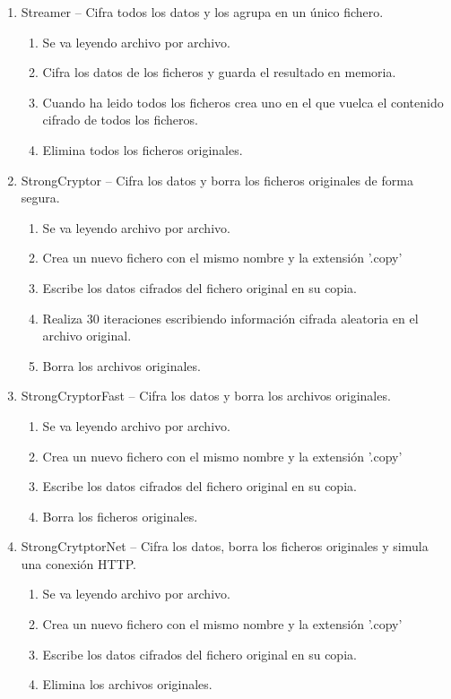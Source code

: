 \documentclass[a4paper,12pt]{article}
\begin{document}
\begin{enumerate}
\begin{enumerate}
\end{enumerate}
\item Streamer – Cifra todos los datos y los agrupa en un único fichero.
\begin{enumerate}
	\item Se va leyendo archivo por archivo.
	\item Cifra los datos de los ficheros y guarda el resultado en memoria.
	\item Cuando ha leido todos los ficheros crea uno en el que vuelca el contenido cifrado de todos los ficheros.
	\item Elimina todos los ficheros originales.
\end{enumerate}
\item StrongCryptor – Cifra los datos y borra los ficheros originales de forma segura.
\begin{enumerate}
	\item Se va leyendo archivo por archivo.
	\item Crea un nuevo fichero con el mismo nombre y la extensión '.copy'
	\item Escribe los datos cifrados del fichero original en su copia.
	\item Realiza 30 iteraciones escribiendo información cifrada aleatoria en el archivo original.
	\item Borra los archivos originales.
\end{enumerate}
\item StrongCryptorFast – Cifra los datos y borra los archivos originales.
\begin{enumerate}
	\item Se va leyendo archivo por archivo.
	\item Crea un nuevo fichero con el mismo nombre y la extensión '.copy'
	\item Escribe los datos cifrados del fichero original en su copia.
	\item Borra los ficheros originales.
\end{enumerate}
\item StrongCrytptorNet – Cifra los datos, borra los ficheros originales y simula una conexión HTTP.
\begin{enumerate}
	\item Se va leyendo archivo por archivo.
	\item Crea un nuevo fichero con el mismo nombre y la extensión '.copy'
	\item Escribe los datos cifrados del fichero original en su copia.
	\item Elimina los archivos originales.

\end{enumerate}
\end{enumerate}
\end{document}
